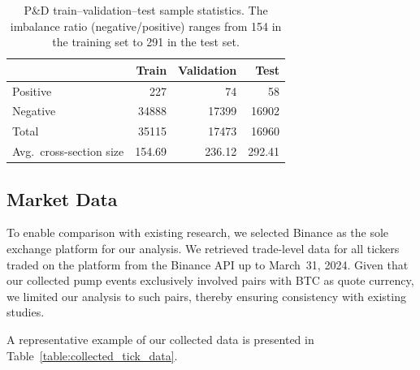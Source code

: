 \documentclass{ieeeaccess}
\begin{document}
\begin{table}[!t]
    \centering
    \setlength{\tabcolsep}{8pt} %
    \renewcommand{\arraystretch}{1.2} %

        \begin{tabular}{lrrr}
            \toprule
             & Train & Validation & Test \\
            \midrule
                Positive & 227 & 74 & 58 \\
                Negative & 34888 & 17399 & 16902 \\
                Total & 35115 & 17473 & 16960\\
                Avg.\ cross-section size & 154.69 & 236.12 & 292.41 \\
            \bottomrule
        \end{tabular}
        \caption{P\&D train--validation--test sample statistics. The imbalance ratio (negative/positive) ranges from 154 in the training set to 291 in the test set.}
     \label{table:train_val_test_stats}
\end{table}

\subsection{Market Data}

To enable comparison with existing research, we selected Binance as the sole exchange platform for our analysis. We retrieved trade-level data for all tickers traded on the platform from the Binance API up to March~31, 2024. Given that our collected pump events exclusively involved pairs with BTC as quote currency, we limited our analysis to such pairs, thereby ensuring consistency with existing studies.

A representative example of our collected data is presented in Table~\ref{table:collected_tick_data}.
\end{document}
